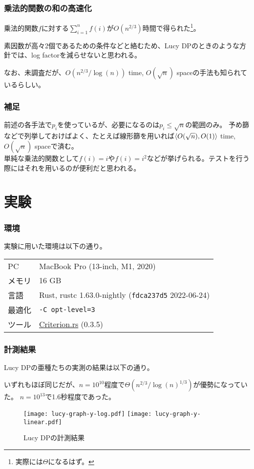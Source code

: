 \documentclass[
  lualatex,
  ja=standard,
  compress,
  hyperref={colorlinks, urlcolor=magenta, linkcolor=blue!55!black},
  dvipsnames,
  svgnames,
]{beamer}
\begin{document}
\begin{frame}
  \frametitle{乗法的関数の和の高速化}

  乗法的関数$f$に対する$\displaystyle\sum_{i=1}^n f(i)$が$O(n^{2/3})$時間で得られた\footnote{実際には$\Theta$になるはず。}。

  素因数が高々2個であるための条件などと絡むため、Lucy DPのときのような方針では、log factorを減らせないと思われる。

  なお、未調査だが、$O(n^{2/3}/\log(n))$ time, $O(\sqrt{n})$ spaceの手法も知られているらしい。
\end{frame}

\begin{frame}
  \frametitle{補足}

  前述の各手法で$p_i$を使っているが、必要になるのは$p_i\le\sqrt{n}$の範囲のみ。
  予め篩などで列挙しておけばよく、たとえば線形篩を用いれば$\langle O(\sqrt{n}), O(1)\rangle$ time, $O(\sqrt{n})$ spaceで済む。\\

  単純な乗法的関数として$f(i) = i$や$f(i) = i^2$などが挙げられる。テストを行う際にはそれを用いるのが便利だと思われる。
\end{frame}

\section{実験}
\begin{frame}
  \frametitle{環境}

  実験に用いた環境は以下の通り。

  \begin{table}
    \begin{tabular}{ll}
      PC & MacBook Pro (13-inch, M1, 2020) \\
      メモリ & 16 GB \\
      言語 & Rust, rustc 1.63.0-nightly (\texttt{\small fdca237d5} 2022-06-24) \\
      最適化 & \texttt{\small -C opt-level=3} \\
      ツール & \href{https://crates.io/crates/criterion}{Criterion.rs} (0.3.5)
    \end{tabular}
  \end{table}
\end{frame}

\setcounter{slidetopic}{0}
\begin{frame}
  \frametitle{計測結果 \theslidetopic}

  Lucy DPの亜種たちの実測の結果は以下の通り。

  いずれもほぼ同じだが、$n=10^{10}$程度で$\Theta(n^{2/3}/\log(n)^{1/3})$が優勢になっていた。
  $n=10^{13}$で1.6秒程度であった。

  \begin{figure}
     { \texttt{[image: lucy-graph-y-log.pdf]} }
     { \texttt{[image: lucy-graph-y-linear.pdf]} }
    \caption{Lucy DPの計測結果}
  \end{figure}
\end{frame}
\end{document}
